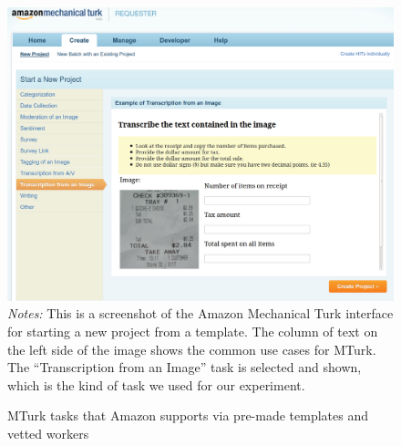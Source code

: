 \documentclass[11pt]{article}
\begin{document}
\begin{figure}
\centering 
\caption{MTurk tasks that Amazon supports via pre-made templates and vetted workers \label{mturk_proof}}
\begin{minipage}{.85\linewidth}
\includegraphics[width = \linewidth]{./images/canonical_mturk_projects.png} 
\\
\footnotesize 
\emph{Notes:} This is a screenshot of the Amazon Mechanical Turk interface for starting a new project from a template. 
The column of text on the left side of the image shows the common use cases for MTurk. 
The ``Transcription from an Image'' task is selected and shown, which is the kind of task we used for our experiment.  
\end{minipage} 
\end{figure} 
\end{document}
